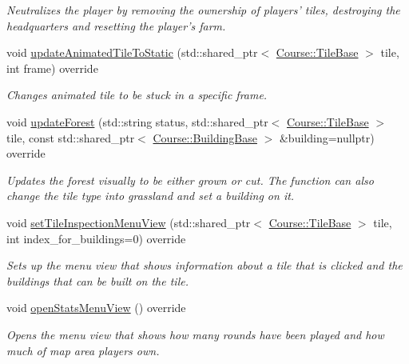 \begin{DoxyCompactItemize}
\begin{DoxyCompactList}\small\item\em Neutralizes the player by removing the ownership of players' tiles, destroying the headquarters and resetting the player's farm. \end{DoxyCompactList}\item 
void \hyperlink{class_student_1_1_game_event_handler_a6cb9513b588826a11a7f0601d068a4bd}{update\-Animated\-Tile\-To\-Static} (std\-::shared\-\_\-ptr$<$ \hyperlink{class_course_1_1_tile_base}{Course\-::\-Tile\-Base} $>$ tile, int frame) override
\begin{DoxyCompactList}\small\item\em Changes animated tile to be stuck in a specific frame. \end{DoxyCompactList}\item 
void \hyperlink{class_student_1_1_game_event_handler_ac29d1ec4eacc1b9efa34183ca6ba3b63}{update\-Forest} (std\-::string status, std\-::shared\-\_\-ptr$<$ \hyperlink{class_course_1_1_tile_base}{Course\-::\-Tile\-Base} $>$ tile, const std\-::shared\-\_\-ptr$<$ \hyperlink{class_course_1_1_building_base}{Course\-::\-Building\-Base} $>$ \&building=nullptr) override
\begin{DoxyCompactList}\small\item\em Updates the forest visually to be either grown or cut. The function can also change the tile type into grassland and set a building on it. \end{DoxyCompactList}\item 
void \hyperlink{class_student_1_1_game_event_handler_a11e4d6d1e9f67bb72f69cd9f9b2b4a60}{set\-Tile\-Inspection\-Menu\-View} (std\-::shared\-\_\-ptr$<$ \hyperlink{class_course_1_1_tile_base}{Course\-::\-Tile\-Base} $>$ tile, int index\-\_\-for\-\_\-buildings=0) override
\begin{DoxyCompactList}\small\item\em Sets up the menu view that shows information about a tile that is clicked and the buildings that can be built on the tile. \end{DoxyCompactList}\item 
void \hyperlink{class_student_1_1_game_event_handler_a8ace791ddeef0cfbe27c09d060a9ec43}{open\-Stats\-Menu\-View} () override
\begin{DoxyCompactList}\small\item\em Opens the menu view that shows how many rounds have been played and how much of map area players own. \end{DoxyCompactList}\item 

\end{DoxyCompactItemize}
